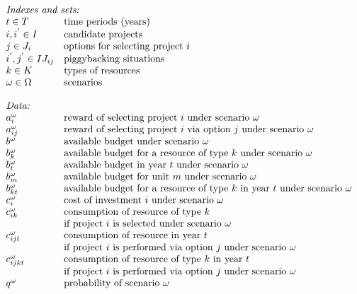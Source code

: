 \[
\begin{array}{ll}
\multicolumn{2}{l}{\mbox{\em Indexes and sets:} } \\
t \in T  & \mbox{time periods (years)} \\
i,i^{'} \in I  & \mbox{candidate projects} \\
j \in J_{i}	& \mbox{options for selecting project $i$} \\
i^{'},j^{'} \in IJ_{ij} & \mbox{piggybacking situations} \\
k \in K	& \mbox{types of resources} \\
\omega \in \Omega & \mbox{scenarios}\\
\\
\multicolumn{2}{l}{\mbox{\em Data:}} \\
a_{i}^{\omega} & \mbox{reward of selecting project $i$ under scenario $\omega$}  \\
a_{ij}^{\omega} & \mbox{reward of selecting project $i$ via option $j$ under scenario $\omega$}  \\
b^{\omega} & \mbox{available budget under scenario $\omega$}\\
b_{k}^{\omega} & \mbox{available budget for a resource of type $k$ under scenario $\omega$}\\
b_{t}^{\omega} & \mbox{available budget in year $t$ under scenario $\omega$}\\
b_{m}^{\omega} & \mbox{available budget for unit $m$ under scenario $\omega$}\\
b_{kt}^{\omega} & \mbox{available budget for a resource of type $k$ in year $t$ under scenario $\omega$}\\
c_{i}^{\omega} & \mbox{cost of investment $i$ under scenario $\omega$} \\
c_{ik}^{\omega} & \mbox{consumption of resource of type $k$} \\
& \mbox{if project $i$ is selected under scenario $\omega$}\\
c_{ijt}^{\omega} & \mbox{consumption of resource in year $t$ } \\
& \mbox{if project $i$ is performed via option $j$ under scenario $\omega$}\\
c_{ijkt}^{\omega} & \mbox{consumption of resource of type $k$ in year $t$ } \\
& \mbox{if project $i$ is performed via option $j$ under scenario $\omega$}\\
q^{\omega} & \mbox{probability of scenario $\omega$}\\

\end{array}\]
